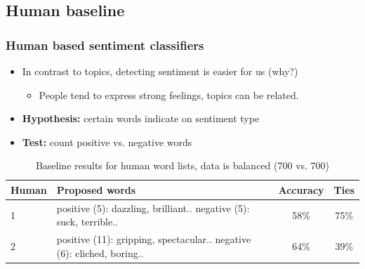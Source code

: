 \documentclass{beamer}
\begin{document}

\subsection{Human baseline}
\begin{frame}
	\frametitle{Human based sentiment classifiers}
	\begin{itemize}
		\item In contrast to topics, detecting sentiment is easier for us (why?)
		\begin{itemize}
		
		\item People tend to express strong feelings, topics can be related.
		\end{itemize}
		
		\item \textbf{Hypothesis:} certain words indicate on sentiment type
		
		\item \textbf{Test:} count positive vs. negative words
	\end{itemize}
	
	\begin{table}
		\scriptsize
		\begin{tabular}{ l | p{5cm} | c | c }
			Human & Proposed words & Accuracy & Ties \footnotemark \\ \hline \hline
			1 & positive (5): dazzling, brilliant.. \newline negative (5): suck, terrible.. & 58\% & 75\% \\ \hline
			2 & positive (11): gripping, spectacular.. \newline negative (6): cliched, boring.. & 64\% & 39\%  \\  \hline
		\end{tabular}
		\caption{Baseline results for human word lists, data is balanced (700 vs. 700)}
	\end{table}
	
\end{frame}
\end{document}
